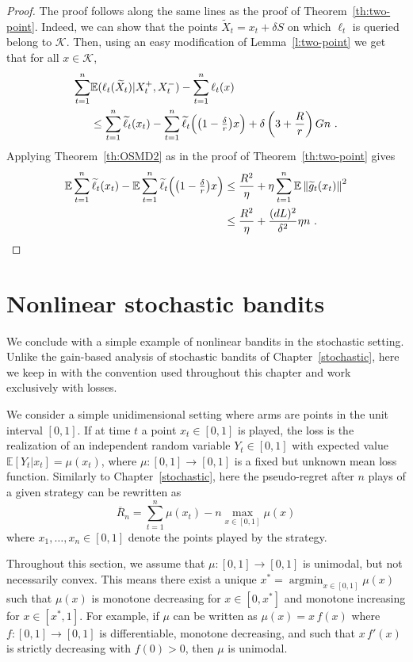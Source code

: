 \documentclass[11pt]{hackednow}
\newcommand{\E}{\mathbb{E}}
\newcommand{\cK}{\mathcal{K}}
\newcommand{\oR}{\overline{R}}
\newcommand{\argmin}{\mathop{\mathrm{argmin}}}
\newcommand{\norm}[1]{\left\|{#1}\right\|}
\newcommand{\tX}{\widetilde{X}}
\newcommand{\tloss}{\widetilde{\ell}}
\newcommand{\gtilde}{\widetilde{g}}
\begin{document}
\begin{proof}
The proof follows along the same lines as the proof of Theorem~\ref{th:two-point}. Indeed, we can show that the points $\tX_t = x_t + \delta S$ on which $\ell_t$ is queried belong to $\cK$. Then, using an easy modification of Lemma~\ref{l:two-point} we get that for all $x\in\cK$,
\begin{align*}
    \sum_{t=1}^n & \E(\ell_t(\tX_t)| X_t^+, X_t^-) - \sum_{t=1}^n \ell_t(x)
\\& \le
    \sum_{t=1}^n \tloss_t(x_t) - \sum_{t=1}^n \tloss_t\Bigl(\bigl(1-\tfrac{\delta}{r}\bigr)x\Bigr) + \delta\left(3 + \frac{R}{r} \right) G n~.
\end{align*}
Applying Theorem~\ref{th:OSMD2} as in the proof of Theorem~\ref{th:two-point} gives
\begin{align*}
    \E \sum_{t=1}^n \tloss_t(x_t) - \E \sum_{t=1}^n \tloss_t\Bigl(\bigl(1-\tfrac{\delta}{r}\bigr)x\Bigr)
& \le
    \frac{R^2}{\eta} + \eta\sum_{t=1}^n \E \norm{\gtilde_t(x_t)}^2
\\& \le
    \frac{R^2}{\eta} + \frac{(dL)^2}{\delta^2}\eta n~.
\end{align*}
\end{proof}


\section{Nonlinear stochastic bandits}
\label{s:nonlinear-stochastic}
%
We conclude with a simple example of nonlinear bandits in the stochastic setting. Unlike the gain-based analysis of stochastic bandits of Chapter~\ref{stochastic}, here we keep in with the convention used throughout this chapter and work exclusively with losses.

We consider a simple unidimensional setting where arms are points in the unit interval $[0,1]$. If at time $t$ a point $x_t \in [0,1]$ is played, the loss is the realization of an independent random variable $Y_t\in [0,1]$ with expected value $\E[Y_t | x_t] = \mu(x_t)$, where $\mu : [0,1]\to [0,1]$ is a fixed but unknown mean loss function. Similarly to Chapter~\ref{stochastic}, here the pseudo-regret after $n$ plays of a given strategy can be rewritten as
\[
    \oR_n = \sum_{t=1}^n \mu(x_t) - n\max_{x\in [0,1]}\mu(x)
\]
where $x_1,\dots,x_n \in [0,1]$ denote the points played by the strategy.

Throughout this section, we assume that $\mu : [0,1] \to [0,1]$ is unimodal, but not necessarily convex. This means there exist a unique $x^* = \argmin_{x \in [0,1]} \mu(x)$ such that $\mu(x)$ is monotone decreasing for $x \in [0,x^*]$ and monotone increasing for $x \in [x^*,1]$. For example, if $\mu$ can be written as $\mu(x) = x\,f(x)$ where $f : [0,1] \to [0,1]$ is differentiable, monotone decreasing, and such that $x\,f'(x)$ is strictly decreasing with $f(0) > 0$, then $\mu$ is unimodal.
\end{document}
